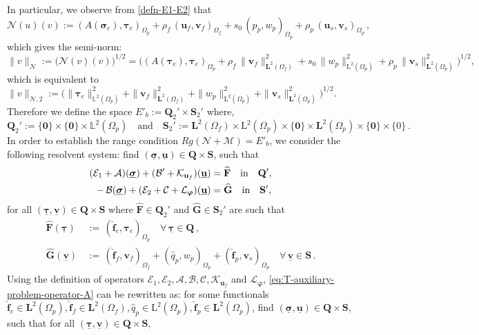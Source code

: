 \documentclass[11pt]{article}
\numberwithin{equation}{section}
\newcommand{\bsi}{{\boldsymbol\sigma}}
\newcommand{\bvarphi}{{\boldsymbol\varphi}}
\newcommand{\btau}{{\boldsymbol\tau}}
\newcommand{\ubsi}{\underline{\bsi}}
\newcommand{\ubtau}{\underline{\btau}}
\newcommand{\ubu}{\underline{\bu}}
\newcommand{\ubv}{\underline{\bv}}
\newcommand{\bv}{{\mathbf{v}}}
\newcommand{\f}{\mathbf{f}}
\newcommand{\bu}{\mathbf{u}}
\newcommand{\0}{{\mathbf{0}}}
\def\bF{\mathbf{F}}
\def\bG{\mathbf{G}}
\def\bQ{\mathbf{Q}}
\def\bS{\mathbf{S}}
\newcommand{\bL}{\mathbf{L}}
\newcommand\bbL{\mathbb{L}}
\newcommand{\cA}{\mathcal{A}}
\newcommand{\cB}{\mathcal{B}}
\newcommand{\cC}{\mathcal{C}}
\newcommand{\cE}{\mathcal{E}}
\newcommand{\cN}{\mathcal{N}}
\newcommand{\cM}{\mathcal{M}}
\newcommand{\cK}{\mathcal{K}}
\newcommand{\cL}{\mathcal{L}}
\def\L{\mathrm{L}}
\def\qin{{\quad\hbox{in}\quad}}
\def\wh{\widehat}
\numberwithin{equation}{section}
\begin{document}
%
In particular, we observe from \eqref{defn-E1-E2} that
%
\begin{equation*}%
\cN(u)(v) := (A(\bsi_e),\btau_{e})_{\Omega_p} + \rho_f\,(\bu_{f},\bv_{f})_{\Omega_f} + s_0\,(p_{p},w_{p})_{\Omega_p} + \rho_p\,(\bu_{s},\bv_{s})_{\Omega_p}\,,
\end{equation*}
%  
which gives the semi-norm:
\begin{equation*}
\|v\|_{\cN} := \big( \cN(v)(v) \big)^{1/2} 
= \big( (A(\btau_e),\btau_{e})_{\Omega_p} + \rho_f\,\|\bv_{f}\|^2_{\bL^2(\Omega_f)} + s_0\,\|w_{p}\|^2_{\L^2(\Omega_p)} + \rho_p\,\|\bv_{s}\|^2_{\bL^2(\Omega_p)} \big)^{1/2},
\end{equation*}
%
which is equivalent to $\|v\|_{\cN,2} := \big( \|\btau_{e}\|^2_{\bbL^2(\Omega_p)} + \|\bv_{f}\|^2_{\bL^2(\Omega_f)} + \|w_{p}\|^2_{\L^2(\Omega_p)} + \|\bv_{s}\|^2_{\bL^2(\Omega_p)} \big)^{1/2}$. Therefore we define the space $E'_b:= \bQ_2'\times \bS_2'$ where,
%
\begin{equation}\label{eq:defn-E'_b-D}
\bQ_2':=\{\0\}\times \{\0\} \times\bbL^2(\Omega_p) \quad \text{and}\quad \bS_2':=\bL^2(\Omega_f) \times \L^2(\Omega_p) \times  \{\0\}\times \bL^2(\Omega_p) \times \{\0\} \times \{0\}\,.
\end{equation}
%
In order to establish the range condition $Rg(\cN + \cM) = E'_b$,
we consider the following resolvent system: find $(\ubsi,\ubu)\in \bQ\times \bS$, such that
\begin{align}
(\cE_1 + \cA)(\ubsi) + (\cB' + \cK_{\bu_f})(\ubu) &= \wh{\bF} \qin \bQ', \nonumber\\ 
-\,\cB(\ubsi) + (\cE_2 + \cC +\cL_{\bvarphi})(\ubu) &= \wh{\bG} \qin \bS',\label{eq:T-auxiliary-problem-operator-A}
\end{align}
%
for all $(\ubtau,\ubv)\in \bQ\times \bS$ where $\wh{\bF} \in \bQ_2'$ and $\wh{\bG} \in \bS_2'$ are such that
\begin{align*}
\wh{\bF}(\ubtau) &\,:=\, (\wh{\f}_e,\btau_e)_{\Omega_p} \quad \forall\,\ubtau \in \bQ\,, \nonumber\\ 
\wh{\bG}(\ubv) &\,:=\, (\wh{\f}_f,\bv_f)_{\Omega_f} + (\wh{q}_p,w_p)_{\Omega_p} + (\wh{\f}_p,\bv_s)_{\Omega_p} \quad \forall\,\ubv \in \bS\,. \nonumber
\end{align*}
Using the definition of operators $\cE_1, \cE_2, \cA, \cB, \cC, \cK_{\bu_f}$ and $\cL_{\bvarphi}$, \eqref{eq:T-auxiliary-problem-operator-A} can be rewritten as: for some functionals $\wh{\f}_e \in \bL^2(\Omega_p), \wh{\f}_f \in \bL^2(\Omega_f), \wh{q}_p \in \L^2(\Omega_p), \wh{\f}_p \in \bL^2(\Omega_p)$, find $(\ubsi,\ubu)\in \bQ\times \bS$, such that for all $(\ubtau,\ubv)\in \bQ\times \bS$,
\end{document}
